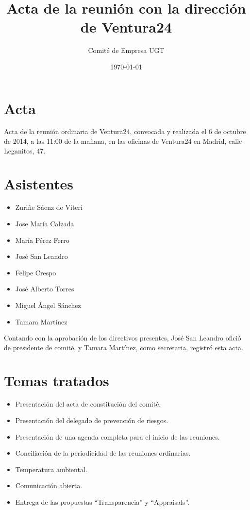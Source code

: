 \documentclass[11pt]{article}
\author{Comité de Empresa UGT}
\date{\today}
\title{Acta de la reunión con la dirección de Ventura24}
\begin{document}
\maketitle
\tableofcontents


\section{Acta}
\label{sec-1}

Acta de la reunión ordinaria de Ventura24, convocada y realizada el 6 de octubre de 2014, a las 11:00 de la mañana, en las oficinas de Ventura24 en Madrid, calle Leganitos, 47.

\section{Asistentes}
\label{sec-2}

\begin{itemize}
\item Zuriñe Sáenz de Viteri
\item Jose María Calzada
\item María Pérez Ferro
\item José San Leandro
\item Felipe Crespo
\item José Alberto Torres
\item Miguel Ángel Sánchez
\item Tamara Martínez
\end{itemize}

Contando con la aprobación de los directivos presentes, José San Leandro ofició de presidente de comité, y Tamara Martínez, como secretaria, registró esta acta.

\section{Temas tratados}
\label{sec-3}

\begin{itemize}
\item Presentación del acta de constitución del comité.

\item Presentación del delegado de prevención de riesgos.

\item Presentación de una agenda completa para el inicio de las reuniones.

\item Conciliación de la periodicidad de las reuniones ordinarias.

\item Temperatura ambiental.

\item Comunicación abierta.

\item Entrega de las propuestas “Transparencia” y “Appraisals”.
\end{itemize}
\end{document}
